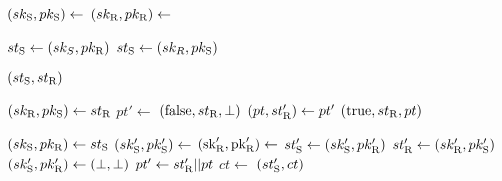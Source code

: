 \algrenewcommand\textproc{}
\algrenewcommand{}

\begin{minipage}{.5\linewidth}
  {\fontsize{10}{12}\selectfont

    \begin{algorithmic}[1]
    \State $(sk_\text{S},pk_\text{S}) \gets$ 
    \State $(sk_\text{R},pk_\text{R}) \gets$ 

    \State $st_\text{S} \gets (sk_S,pk_\text{R})$ 
    \State $st_\text{S} \gets (sk_R,pk_\text{S})$ 

    \State \Return $(st_\text{S},st_\text{R})$
    \EndProcedure
    \end{algorithmic}

    \vspace{10pt}

    \begin{algorithmic}[1]
    \State $(sk_\text{R},pk_\text{S}) \gets st_\text{R}$ 
    \State $pt' \gets$ 
    \State \Return $(\text{false}, st_\text{R}, \perp)$
    \EndIf
    \State $(pt,st_\text{R}') \gets pt'$
    \State \Return $(\text{true},st_\text{R}, pt)$
    \EndProcedure
   
  \end{algorithmic}
  }
\end{minipage}

\begin{minipage}{.5\linewidth}
  {\fontsize{10}{12}\selectfont

  \begin{algorithmic}[1]
    \State $(sk_\text{S},pk_\text{R}) \gets st_\text{S}$ 
    \State $(sk_\text{S}',pk_\text{S}') \gets$ 
    \State $(\text{sk}_\text{R}',\text{pk}_\text{R}') \gets$ 
    \State $st_\text{S}' \gets (sk_\text{S}',pk_\text{R}')$
    \State $st_\text{R}' \gets (sk_\text{R}',pk_\text{S}')$
    \Else
    \State $(sk_\text{S}',pk_\text{R}') \gets (\perp,\perp)$
    \EndIf
    \State $pt' \gets st_\text{R}' || pt$
    \State $ct \gets$ 
    \State \Return $(st_\text{S}', ct)$
    \EndProcedure
    
  \end{algorithmic}
  }
\end{minipage}
